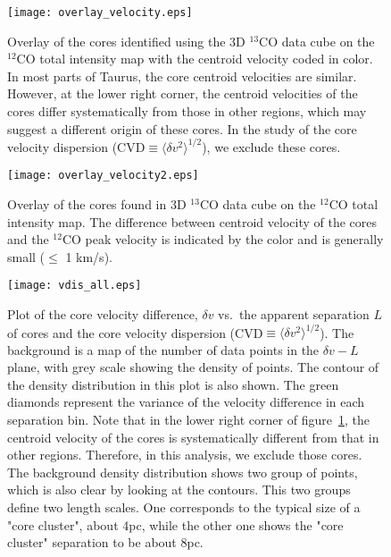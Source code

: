 \documentclass[12pt,preprint]{aastex}
\begin{document}
\begin{figure}[htb]
\centering
\texttt{[image: overlay\_velocity.eps]}
\caption{ Overlay of the cores identified using the 3D $^{13}$CO data cube
on the $^{12}$CO total intensity map with the centroid velocity coded in color.
In most parts of Taurus, the core centroid velocities are similar. However,
at the lower right corner, the centroid velocities of the cores differ systematically from those in other regions, which may suggest
a different origin of these cores. In the study of the core velocity dispersion (CVD$\equiv \langle\delta v^2\rangle^{1/2}$), we exclude these cores.\label{overlay_velocity}}
\end{figure}


\begin{figure}[htb]
\centering
\texttt{[image: overlay\_velocity2.eps]}
\caption{ Overlay of the cores found in 3D $^{13}$CO data cube on the $^{12}$CO total intensity map. The difference
between centroid velocity of the cores and the $^{12}$CO peak velocity is indicated by the color and is generally small ($\leq$ 1 km/s). \label{overlay_velocity2}}
\end{figure}




\clearpage
\begin{figure}[htb]
\centering
\texttt{[image: vdis\_all.eps]}
\caption{ Plot of the core velocity difference, $\delta v$  vs.\  the apparent separation $L$ of cores and the core velocity dispersion (CVD$\equiv \langle\delta v^2\rangle^{1/2}$).
The background is a map of the number of data points in the $\delta v - L$ plane, with grey scale showing the
density of points. The contour of the density distribution in this plot is also shown.
The green diamonds represent the variance of the velocity difference in each separation bin.
Note that in the lower right corner of figure~\ref{overlay_velocity},  the centroid velocity of the
cores is systematically different from that in other regions. Therefore, in this analysis, we exclude those cores.
The background density distribution shows two group of points, which is also clear by looking at the contours. This two groups define two length scales. One corresponds to the typical size of a "core cluster", about 4pc, while the other one shows the "core cluster" separation to be about 8pc.
\label{vdis_all}}
\end{figure}
\clearpage
\end{document}
